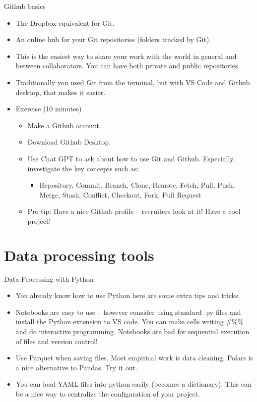 \documentclass{beamer}
\begin{document}
\begin{frame}{Github basics}
    \begin{itemize}
        \item The Dropbox equivalent for Git.
        \item An online hub for your Git repositories (folders tracked by Git).
        \item This is the easiest way to share your work with the world in general and between collaborators. You can have both private and public repositories.
        \item Traditionally you used Git from the terminal, but with VS Code and Github desktop, that makes it easier.
        \item Exercise (10 minutes)
        \begin{itemize}
            \item Make a Github account.
            \item Download Github Desktop.
            \item Use Chat GPT to ask about how to use Git and Github. Especially, investigate the key concepts such as:
            \begin{itemize}
                \item Repository, Commit, Branch, Clone, Remote, Fetch, Pull, Push, Merge, Stash, Conflict, Checkout, Fork, Pull Request 
            \end{itemize}
            \item Pro tip: Have a nice Github profile – recruiters look at it! Have a cool project!
        \end{itemize}
    \end{itemize}
\end{frame}


\section{Data processing tools}

\begin{frame}{Data Processing with Python}

\begin{itemize}
    \item You already know how to use Python here are some extra tips and tricks.
    \item Notebooks are easy to use – however consider using standard .py files and install the Python extension to VS code. You can make cells writing $\#\%\%$ and do interactive programming. Notebooks are bad for sequential execution of files and version control!
    \item Use Parquet when saving files. Most empirical work is data cleaning. Polars is a nice alternative to Pandas. Try it out.
    \item You can load YAML files into python easily (becomes a dictionary). This can be a nice way to centralize the configuration of your project.
\end{itemize}
\end{frame}
\end{document}
